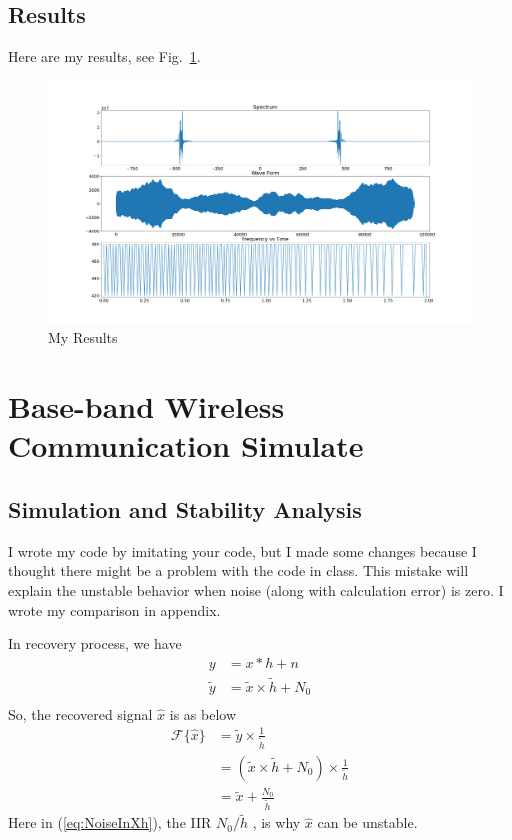 \documentclass{article}
\begin{document}
\subsection{Results}
Here are my results, see Fig.~\ref{fig:MosquitoResults}.
\begin{figure}[!h]
	\centering
	\includegraphics[width=3 in]{../pic/MosquitoResults.png}
	\caption{My Results}
	\label{fig:MosquitoResults}
\end{figure}

\section{Base-band Wireless Communication Simulate}
\subsection{Simulation and Stability Analysis}
I wrote my code by imitating your code, but I made some changes because I thought there might be a problem with the code in class. This mistake will explain the unstable behavior when noise (along with calculation error) is zero. I wrote my comparison in appendix.

In recovery process, we have
\begin{equation}
	\begin{aligned}
		y &= x * h + n \\ 
		\tilde{y} &= \tilde{x} \times \tilde{h} + N_0 \\
	\end{aligned}
\end{equation}
So, the recovered signal $\hat{x}$ is as below
\begin{equation}
	\begin{aligned}
		\mathcal{F}\{\hat{x}\} &= \tilde{y} \times \frac{1}{\tilde{h}} \\  
		&= ( \tilde{x} \times \tilde{h} + N_0 ) \times \frac{1}{\tilde{h}} \\ 
		&= \tilde{x} + \frac{N_0}{\tilde{h}}
	\end{aligned}
	\label{eq:NoiseInXh}
\end{equation}
Here in (\ref{eq:NoiseInXh}), the IIR $N_0/\tilde{h}$ , is why $\hat{x}$ can be unstable.
\end{document}
